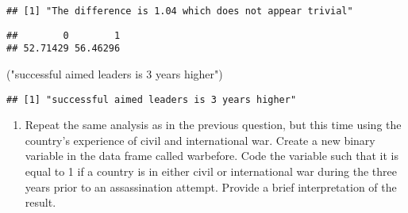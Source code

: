 \documentclass[
]{article}
\newenvironment{Shaded}{\begin{snugshade}}{\end{snugshade}}
\newcommand{\DecValTok}[1]{\textcolor[rgb]{0.00,0.00,0.81}{#1}}
\newcommand{\KeywordTok}[1]{\textcolor[rgb]{0.13,0.29,0.53}{\textbf{#1}}}
\newcommand{\NormalTok}[1]{#1}
\newcommand{\OperatorTok}[1]{\textcolor[rgb]{0.81,0.36,0.00}{\textbf{#1}}}
\newcommand{\StringTok}[1]{\textcolor[rgb]{0.31,0.60,0.02}{#1}}
\providecommand{\tightlist}{%
  \setlength{\itemsep}{0pt}\setlength{\parskip}{0pt}}
\begin{document}
\begin{verbatim}
## [1] "The difference is 1.04 which does not appear trivial"
\end{verbatim}

\begin{Shaded}
\end{Shaded}

\begin{verbatim}
##        0        1 
## 52.71429 56.46296
\end{verbatim}

\begin{Shaded}
\begin{Highlighting}[]
\NormalTok{(}\StringTok{"successful aimed leaders is 3 years higher"}\NormalTok{)}
\end{Highlighting}
\end{Shaded}

\begin{verbatim}
## [1] "successful aimed leaders is 3 years higher"
\end{verbatim}

\begin{enumerate}
\def\labelenumi{\arabic{enumi}.}
\setcounter{enumi}{3}
\tightlist
\item
  Repeat the same analysis as in the previous question, but this time
  using the country's experience of civil and international war. Create
  a new binary variable in the data frame called warbefore. Code the
  variable such that it is equal to 1 if a country is in either civil or
  international war during the three years prior to an assassination
  attempt. Provide a brief interpretation of the result.
\end{enumerate}

\begin{Shaded}
\end{Shaded}
\end{document}
